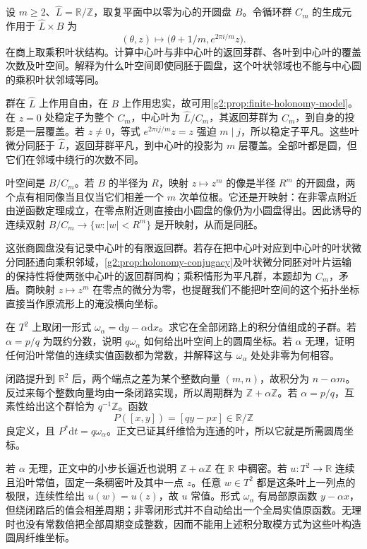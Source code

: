 \begin{exercise}\label{g2:ex:cyclic-holonomy-disk-model}
	设 \(m\geq2\)、\(\widehat L=\mathbb R/\mathbb Z\)，取复平面中以零为心的开圆盘 \(B\)。令循环群 \(C_m\) 的生成元作用于 \(\widehat L\times B\) 为
	\[
		(\theta,z)\longmapsto\bigl(\theta+1/m,e^{2\pi i/m}z\bigr).
	\]
	在商上取乘积叶状结构。计算中心叶与非中心叶的返回芽群、各叶到中心叶的覆盖次数及叶空间。解释为什么叶空间即使同胚于圆盘，这个叶状邻域也不能与中心圆的乘积叶状邻域等同。
\end{exercise}
\begin{solution}
	群在 \(\widehat L\) 上作用自由，在 \(B\) 上作用忠实，故可用\cref{g2:prop:finite-holonomy-model}。在 \(z=0\) 处稳定子为整个 \(C_m\)，中心叶为 \(\widehat L/C_m\)，其返回芽群为 \(C_m\)，到自身的投影是一层覆盖。若 \(z\ne0\)，等式 \(e^{2\pi i j/m}z=z\) 强迫 \(m\mid j\)，所以稳定子平凡。这些叶微分同胚于 \(\widehat L\)，返回芽群平凡，到中心叶的投影为 \(m\) 层覆盖。全部叶都是圆，但它们在邻域中绕行的次数不同。

	叶空间是 \(B/C_m\)。若 \(B\) 的半径为 \(R\)，映射 \(z\mapsto z^m\) 的像是半径 \(R^m\) 的开圆盘，两个点有相同像当且仅当它们相差一个 \(m\) 次单位根。它还是开映射：在非零点附近由逆函数定理成立，在零点附近则直接由小圆盘的像仍为小圆盘得出。因此诱导的连续双射 \(B/C_m\to\{w:|w|<R^m\}\) 是开映射，从而是同胚。

	这张商圆盘没有记录中心叶的有限返回群。若存在把中心叶对应到中心叶的叶状微分同胚通向乘积邻域，\cref{g2:prop:holonomy-conjugacy}及叶状微分同胚对叶片运输的保持性将使两张中心叶的返回群同构；乘积情形为平凡群，本题却为 \(C_m\)，矛盾。商映射 \(z\mapsto z^m\) 在零点的微分为零，也提醒我们不能把叶空间的这个拓扑坐标直接当作原流形上的淹没横向坐标。
\end{solution}

\begin{exercise}\label{g2:ex:torus-foliation-periods}
	在 \(T^2\) 上取闭一形式 \(\omega_\alpha=\mathrm dy-\alpha\mathrm dx\)。求它在全部闭路上的积分值组成的子群。若 \(\alpha=p/q\) 为既约分数，说明 \(q\omega_\alpha\) 如何给出叶空间上的圆周坐标。若 \(\alpha\) 无理，证明任何沿叶常值的连续实值函数都为常数，并解释这与 \(\omega_\alpha\) 处处非零为何相容。
\end{exercise}
\begin{solution}
	闭路提升到 \(\mathbb R^2\) 后，两个端点之差为某个整数向量 \((m,n)\)，故积分为 \(n-\alpha m\)。反过来每个整数向量均由一条闭路实现，所以周期群为 \(\mathbb Z+\alpha\mathbb Z\)。若 \(\alpha=p/q\)，互素性给出这个群恰为 \(q^{-1}\mathbb Z\)。函数
	\[
		P([x,y])=[qy-px]\in\mathbb R/\mathbb Z
	\]
	良定义，且 \(P^*\mathrm dt=q\omega_\alpha\)。正文已证其纤维恰为连通的叶，所以它就是所需圆周坐标。

	若 \(\alpha\) 无理，正文中的小步长逼近也说明 \(\mathbb Z+\alpha\mathbb Z\) 在 \(\mathbb R\) 中稠密。若 \(u:T^2\to\mathbb R\) 连续且沿叶常值，固定一条稠密叶及其中一点 \(z\)。任意 \(w\in T^2\) 都是这条叶上一列点的极限，连续性给出 \(u(w)=u(z)\)，故 \(u\) 常值。形式 \(\omega_\alpha\) 有局部原函数 \(y-\alpha x\)，但绕闭路后的值会相差周期；非零闭形式并不自动给出一个全局实值原函数。无理时也没有常数倍把全部周期变成整数，因而不能用上述积分取模方式为这些叶构造圆周纤维坐标。
\end{solution}

